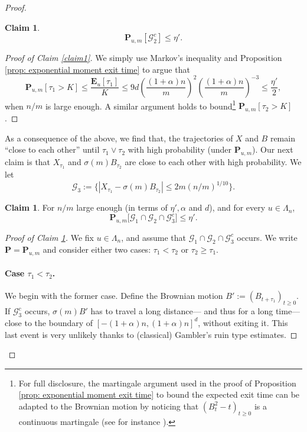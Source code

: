 \documentclass[11pt,a4paper]{article}
\numberwithin{equation}{section}
\theoremstyle{plain}
\theoremstyle{definition}
\newtheorem{Claim}[Thm]{Claim}
\begin{document}
\begin{proof}
\begin{Claim}
\begin{equation}
	\mathbf P_{u,m}[\mathcal G_2^c]\leq \eta'.
\end{equation}
\end{Claim}
\begin{proof}[Proof of Claim \textup{\ref{claim1}}] We simply use Markov's inequality and Proposition \ref{prop: exponential moment exit time} to argue that
\begin{equation}
	\mathbf P_{u,m}[\tau_1>K]\leq \frac{\mathbf E_u[\tau_1]}{K}\leq 9d\left(\frac{(1+\alpha)n}{m}\right)^2\left(\frac{(1+\alpha)n}{m}\right)^{-3}\leq \frac{\eta'}{2},
\end{equation}
when $n/m$ is large enough. A similar argument holds to bound\footnote{For full disclosure, the martingale argument used in the proof of Proposition \ref{prop: exponential moment exit time} to bound the expected exit time can be adapted to the Brownian motion by noticing that $(B_t^2-t)_{t\geq 0}$ is a continuous martingale (see for instance \cite[Chapter~3.3]{le2016brownian}).} $\mathbf P_{u,m}[\tau_2>K]$.
\end{proof}
As a consequence of the above, we find that, the trajectories of $X$ and $B$ remain ``close to each other'' until $\tau_1\vee \tau_2$ with high probability (under $\mathbf P_{u,m}$). Our next claim is that $X_{\tau_1}$ and $\sigma(m)B_{\tau_2}$ are close to each other with high probability. We let
\begin{equation}
	\mathcal G_3:=\Big\{|X_{\tau_1}-\sigma(m)B_{\tau_2}|\leq 2m(n/m)^{1/10}\Big\}.
\end{equation}
\begin{Claim}\label{claim2} For $n/m$ large enough (in terms of $\eta',\alpha$ and $d$), and for every $u \in \Lambda_n$,
\begin{equation}\label{eq:BM 2.5}
	\mathbf P_{u,m}\Big[\mathcal G_1 \cap \mathcal G_2 \cap \mathcal G_3^c\Big]\leq\eta'.
\end{equation}
\end{Claim}
\begin{proof}[Proof of Claim \textup{\ref{claim2}}] We fix $u\in \Lambda_n$, and assume that $\mathcal G_1\cap \mathcal G_2\cap \mathcal G_3^c$ occurs. We write $\mathbf P=\mathbf P_{u,m}$ and consider either two cases: $\tau_1<\tau_2$ or $\tau_2\geq \tau_1$. 

\paragraph{Case $\tau_1<\tau_2$.} We begin with the former case. Define the Brownian motion $B':=(B_{t+\tau_1})_{t\geq 0}$. If $\mathcal G_3^c$ occurs, $\sigma(m)B'$ has to travel a long distance--- and thus for a long time--- close to the boundary of $[-(1+\alpha)n,(1+\alpha)n]^d$, without exiting it. This last event is very unlikely thanks to (classical) Gambler's ruin type estimates.


\end{proof}
\end{proof}
\end{document}
